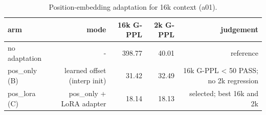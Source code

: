 \begin{table}[t]
\centering
\caption{Position-embedding adaptation for 16k context (a01).}
\label{tab:opt-pos}
\begin{tabular}{lrrrr}
\toprule
arm & mode & 16k G-PPL & 2k G-PPL & judgement \\
\midrule
no adaptation & - & 398.77 & 40.01 & reference \\
pos_only (B) & learned offset (interp init) & 31.42 & 32.49 & 16k G-PPL < 50 PASS; no 2k regression \\
pos_lora (C) & pos_only + LoRA adapter & 18.14 & 18.13 & selected; best 16k and 2k \\
\bottomrule
\end{tabular}
\end{table}
